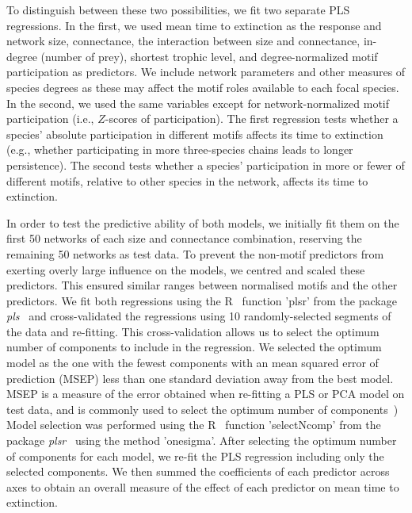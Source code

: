 \documentclass[12pt]{article}
\begin{document}
      
      To distinguish between these two possibilities, we fit two separate PLS regressions.
      In the first, we used mean time to extinction as the response and network size, connectance, the interaction between size and connectance, in-degree (number of prey), shortest trophic level, and degree-normalized motif participation as predictors.
      We include network parameters and other measures of species degrees as these may affect the motif roles available to each focal species.
      In the second, we used the same variables except for network-normalized motif participation (i.e., $Z$-scores of participation).
      The first regression tests whether a species' absolute participation in different motifs affects its time to extinction (e.g., whether participating in more three-species chains leads to longer persistence).
      The second tests whether a species' participation in more or fewer of different motifs, relative to other species in the network, affects its time to extinction. 

      
      In order to test the predictive ability of both models, we initially fit them on the first 50 networks of each size and connectance combination, reserving the remaining 50 networks as test data.
      To prevent the non-motif predictors from exerting overly large influence on the models, we centred and scaled these predictors. 
      This ensured similar ranges between normalised motifs and the other predictors.
      We fit both regressions using the R~\citep{R} function 'plsr' from the package \emph{pls}~\citep{pls} and cross-validated the regressions using 10 randomly-selected segments of the data and re-fitting.
      This cross-validation allows us to select the optimum number of components to include in the regression.
      We selected the optimum model as the one with the fewest components with an mean squared error of prediction (MSEP) less than one standard deviation away from the best model.
      MSEP is a measure of the error obtained when re-fitting a PLS or PCA model on test data, and is commonly used to select the optimum number of components~\citep{Mevik2004})
      Model selection was performed using the R~\citep{R} function 'selectNcomp' from the package \emph{plsr}~\citep{pls} using the method 'onesigma'.
      After selecting the optimum number of components for each model, we re-fit the PLS regression including only the selected components. 
      We then summed the coefficients of each predictor across axes to obtain an overall measure of the effect of each predictor on mean time to extinction.
\end{document}
